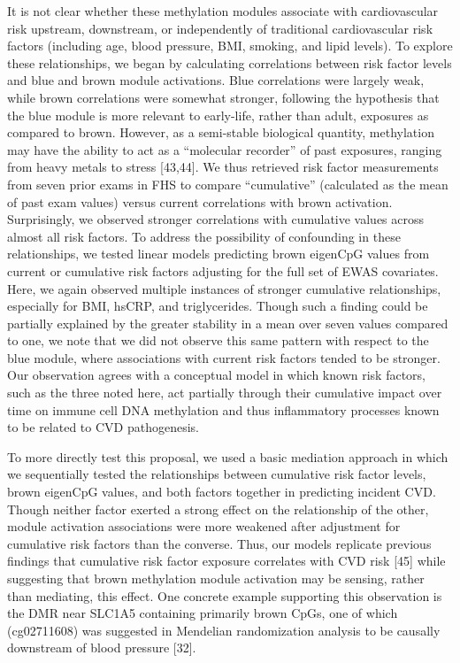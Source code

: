 \documentclass[]{bmcart}
\theoremstyle{definition}
\theoremstyle{definition}
\theoremstyle{definition}
\theoremstyle{remark}
\begin{document}
It is not clear whether these methylation modules associate with
cardiovascular risk upstream, downstream, or independently of
traditional cardiovascular risk factors (including age, blood pressure,
BMI, smoking, and lipid levels). To explore these relationships, we
began by calculating correlations between risk factor levels and blue
and brown module activations. Blue correlations were largely weak,
while brown correlations were somewhat stronger, following the
hypothesis that the blue module is more relevant to early-life, rather
than adult, exposures as compared to brown. However, as a semi-stable
biological quantity, methylation may have the ability to act as a
``molecular recorder'' of past exposures, ranging from heavy metals to
stress {[}43,44{]}. We thus retrieved risk factor measurements from
seven prior exams in FHS to compare ``cumulative'' (calculated as the
mean of past exam values) versus current correlations with brown
activation. Surprisingly, we observed stronger correlations with
cumulative values across almost all risk factors. To address the
possibility of confounding in these relationships, we tested linear
models predicting brown eigenCpG values from current or cumulative risk
factors adjusting for the full set of EWAS covariates. Here, we again
observed multiple instances of stronger cumulative relationships,
especially for BMI, hsCRP, and triglycerides. Though such a finding
could be partially explained by the greater stability in a mean over
seven values compared to one, we note that we did not observe this same
pattern with respect to the blue module, where associations with current
risk factors tended to be stronger. Our observation agrees with a
conceptual model in which known risk factors, such as the three noted
here, act partially through their cumulative impact over time on immune
cell DNA methylation and thus inflammatory processes known to be related
to CVD pathogenesis.

To more directly test this proposal, we used a basic mediation approach
in which we sequentially tested the relationships between cumulative
risk factor levels, brown eigenCpG values, and both factors together in
predicting incident CVD. Though neither factor exerted a strong effect
on the relationship of the other, module activation associations were
more weakened after adjustment for cumulative risk factors than the
converse. Thus, our models replicate previous findings that cumulative
risk factor exposure correlates with CVD risk {[}45{]} while suggesting
that brown methylation module activation may be sensing, rather than
mediating, this effect. One concrete example supporting this observation
is the DMR near SLC1A5 containing primarily brown CpGs, one of which
(cg02711608) was suggested in Mendelian randomization analysis to be
causally downstream of blood pressure {[}32{]}.
\end{document}
